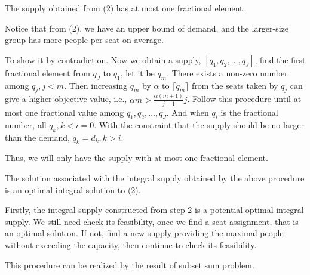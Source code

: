 \begin{thm}
  The supply obtained from (2) has at most one fractional element.
\end{thm}

Notice that from (2), we have an upper bound of demand, and the larger-size group has more people per seat on average.


To show it by contradiction. Now we obtain a supply, $[q_1, q_2, \ldots, q_{J}]$, find the first fractional element from $q_{J}$ to $q_{1}$, let it be $q_{m}$. There exists a non-zero number among $q_{j}, j<m$. Then increasing $q_{m}$ by $\alpha$ to $\lceil q_{m} \rceil$ from the seats taken by $q_{j}$ can give a higher objective value, i.e., $\alpha m > \frac{\alpha(m+1)}{j+1} j$. Follow this procedure until at most one fractional value among $q_1, q_2, \ldots, q_{J}$. 
And when $q_i$ is the fractional number, all $q_k, k<i =0$. With the constraint that the supply should be no larger than the demand, $q_k = d_k, k>i$.

Thus, we will only have the supply with at most one fractional element.

\begin{corollary}
 The solution associated with the integral supply obtained by the above procedure is an optimal integral solution to (2).
\end{corollary}

Firstly, the integral supply constructed from step 2 is a potential optimal integral supply. We still need check its feasibility, once we find a seat assignment, that is an optimal solution. If not, find a new supply providing the maximal people without exceeding the capacity, then continue to check its feasibility.

This procedure can be realized by the result of subset sum problem.






